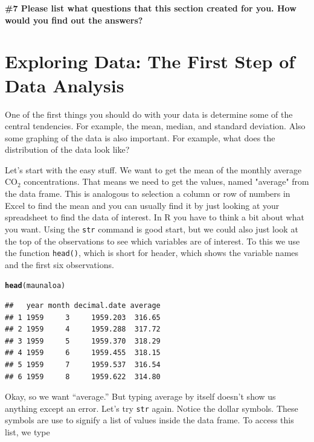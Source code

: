 \documentclass{tufte-handout}\usepackage[]{graphicx}\usepackage[]{xcolor}
\makeatletter
\newcommand{\hlstd}[1]{\textcolor[rgb]{0.345,0.345,0.345}{#1}}%
\newcommand{\hlkwd}[1]{\textcolor[rgb]{0.737,0.353,0.396}{\textbf{#1}}}%
\newenvironment{kframe}{%
 \def\at@end@of@kframe{}%
 \ifinner\ifhmode%
  \def\at@end@of@kframe{\end{minipage}}%
  \begin{minipage}{\columnwidth}%
 \fi\fi%
 \def\FrameCommand##1{\hskip\@totalleftmargin \hskip-\fboxsep
 \colorbox{shadecolor}{##1}\hskip-\fboxsep
     \hskip-\linewidth \hskip-\@totalleftmargin \hskip\columnwidth}%
 \MakeFramed {\advance\hsize-\width
   \@totalleftmargin\z@ \linewidth\hsize
   \@setminipage}}%
 {\par\unskip\endMakeFramed%
 \at@end@of@kframe}
\newenvironment{knitrout}{}{} %
\makeatother
\begin{document}
\bigskip
\noindent \textbf{\#7 Please list what questions that this section created for you. How would you find out the answers? }
 
\section{Exploring Data: The First Step of Data Analysis}

One of the first things you should do with your data is determine some of the central tendencies. For example, the mean, median, and standard deviation. Also some graphing of the data is also important. For example, what does the distribution of the data look like? 

Let's start with the easy stuff. We want to get the mean of the monthly average CO$_2$ concentrations. That means we need to get the values, named "average" from the data frame. This is analogous to selection a column or row of numbers in Excel to find the mean and you can usually find it by just looking at your spreadsheet to find the data of interest. In R you have to think a bit about what you want. Using the \texttt{str} command is good start, but we could also just look at the top of the observations to see which variables are of interest. To this we use the function \texttt{head()}, which is short for header, which shows the variable names and the first six observations.

\begin{knitrout}
\color{fgcolor}\begin{kframe}
\begin{alltt}
\hlkwd{head}\hlstd{(maunaloa)}
\end{alltt}
\begin{verbatim}
##   year month decimal.date average
## 1 1959     3     1959.203  316.65
## 2 1959     4     1959.288  317.72
## 3 1959     5     1959.370  318.29
## 4 1959     6     1959.455  318.15
## 5 1959     7     1959.537  316.54
## 6 1959     8     1959.622  314.80
\end{verbatim}
\end{kframe}
\end{knitrout}

Okay, so we want ``average.'' But typing average by itself doesn't show us anything except an error. Let's try \texttt{str} again. Notice the dollar symbols.  These symbols are use to signify a list of values inside the data frame. To access this list, we type
\end{document}
